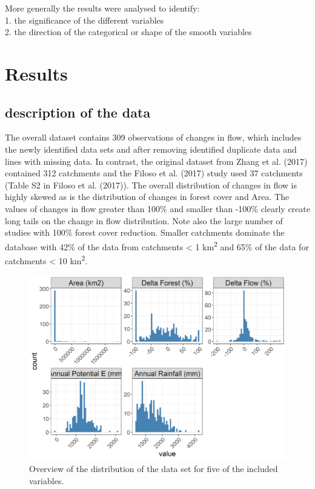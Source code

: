 \documentclass[]{elsarticle} %
\begin{document}
More generally the results were analysed to identify:\\
1. the significance of the different variables\\
2. the direction of the categorical or shape of the smooth variables

\hypertarget{results}{%
\section{Results}\label{results}}

\hypertarget{description-of-the-data}{%
\subsection{description of the data}\label{description-of-the-data}}

The overall dataset contains 309 observations of changes in flow, which includes the newly identified data sets and after removing identified duplicate data and lines with missing data. In contrast, the original dataset from Zhang et al. (2017) contained 312 catchments and the Filoso et al. (2017) study used 37 catchments (Table S2 in Filoso et al. (2017)). The overall distribution of changes in flow is highly skewed as is the distribution of changes in forest cover and Area. The values of changes in flow greater than 100\% and smaller than -100\% clearly create long tails on the change in flow distribution. Note also the large number of studies with 100\% forest cover reduction. Smaller catchments dominate the database with 42\% of the data from catchments \textless{} 1 km\textsuperscript{2} and 65\% of the data for catchments \textless{} 10 km\textsuperscript{2}.



\begin{figure}
\includegraphics[width=0.9\linewidth]{./DataExploration} \caption{Overview of the distribution of the data set for five of the included variables.}\label{fig:datagraphs}
\end{figure}
\end{document}
